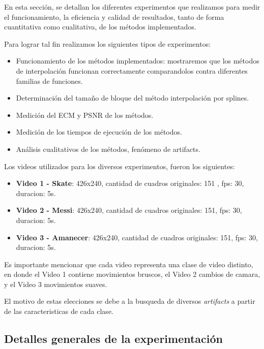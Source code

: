 En esta sección, se detallan los diferentes experimentos que realizamos para medir el funcionamiento, la eficiencia y calidad de resultados, tanto de forma cuantitativa como cualitativa, de los métodos implementados.

Para lograr tal fin realizamos los siguientes tipos de experimentos:
\begin{itemize}
  \item Funcionamiento de los métodos implementados: mostraremos que los métodos de interpolación funcionan correctamente comparandolos contra diferentes familias de funciones.
  \item Determinación del tamaño de bloque del método interpolación por splines.
  \item Medición del ECM y PSNR de los métodos.
  \item Medición de los tiempos de ejecución de los métodos.
  \item Análisis cualitativos de los métodos, fenómeno de artifacts.
\end{itemize}

Los videos utilizados para los diversos experimentos, fueron los siguientes:

\begin{itemize}
  \item \textbf{Video 1 - Skate}: 426x240, cantidad de cuadros originales: 151 , fps: 30, duracion: 5s.
  \item \textbf{Video 2 - Messi}: 426x240, cantidad de cuadros originales: 151, fps: 30, duracion: 5s.
  \item \textbf{Video 3 - Amanecer}: 426x240, cantidad de cuadros originales: 151, fps: 30, duracion: 5s.
\end{itemize}

Es importante mencionar que cada video representa una clase de video distinto, en donde el Video 1 contiene movimientos bruscos, el Video 2 cambios de camara, y el Video 3 movimientos suaves.

El motivo de estas elecciones se debe a la busqueda de diversos \textit{artifacts} a partir de las caracteristicas de cada clase.

\subsection{Detalles generales de la experimentación}

